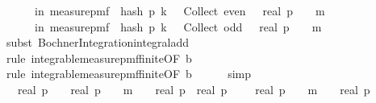 \begin{isabellebody}
\ \ \ \ \ {\isasymP}{\isacharparenleft}{\kern0pt}{\isasymomega}\ in\ measure{\isacharunderscore}{\kern0pt}pmf\ {\isasymOmega}{\isachardot}{\kern0pt}\ hash\ p\ k\ {\isasymomega}\ {\isasymin}\ Collect\ even{\isacharparenright}{\kern0pt}\ \ {\isacharasterisk}{\kern0pt}\ {\isacharparenleft}{\kern0pt}real\ p\ {\isacharminus}{\kern0pt}\ {}{\isacharparenright}{\kern0pt}\ {\isacharcircum}{\kern0pt}\ m\ \ {\isacharplus}{\kern0pt}\ \isanewline
\ \ \ \ \ {\isasymP}{\isacharparenleft}{\kern0pt}{\isasymomega}\ in\ measure{\isacharunderscore}{\kern0pt}pmf\ {\isasymOmega}{\isachardot}{\kern0pt}\ hash\ p\ k\ {\isasymomega}\ {\isasymin}\ Collect\ odd{\isacharparenright}{\kern0pt}\ \ {\isacharasterisk}{\kern0pt}\ {\isacharparenleft}{\kern0pt}{\isacharminus}{\kern0pt}real\ p\ {\isacharminus}{\kern0pt}\ {}{\isacharparenright}{\kern0pt}\ {\isacharcircum}{\kern0pt}\ m\ {\isachardoublequoteclose}\isanewline
\ \ \ \ \isamarkupfalse%
\ {\isacharparenleft}{\kern0pt}subst\ Bochner{\isacharunderscore}{\kern0pt}Integration{\isachardot}{\kern0pt}integral{\isacharunderscore}{\kern0pt}add{\isacharparenright}{\kern0pt}\isanewline
\ \ \ \ \isamarkupfalse%
\ {\isacharparenleft}{\kern0pt}rule\ integrable{\isacharunderscore}{\kern0pt}measure{\isacharunderscore}{\kern0pt}pmf{\isacharunderscore}{\kern0pt}finite{\isacharbrackleft}{\kern0pt}OF\ b{\isacharbrackright}{\kern0pt}{\isacharparenright}{\kern0pt}\isanewline
\ \ \ \ \isamarkupfalse%
\ {\isacharparenleft}{\kern0pt}rule\ integrable{\isacharunderscore}{\kern0pt}measure{\isacharunderscore}{\kern0pt}pmf{\isacharunderscore}{\kern0pt}finite{\isacharbrackleft}{\kern0pt}OF\ b{\isacharbrackright}{\kern0pt}{\isacharparenright}{\kern0pt}\isanewline
\ \ \ \ \isamarkupfalse%
\ simp\isanewline
\ \ \isamarkupfalse%
\ \isamarkupfalse%
\ {\isachardoublequoteopen}{\isachardot}{\kern0pt}{\isachardot}{\kern0pt}{\isachardot}{\kern0pt}\ {\isacharequal}{\kern0pt}\ {\isacharparenleft}{\kern0pt}real\ p\ {\isacharplus}{\kern0pt}\ {}{\isacharparenright}{\kern0pt}\ {\isacharasterisk}{\kern0pt}\ {\isacharparenleft}{\kern0pt}real\ p\ {\isacharminus}{\kern0pt}\ {}{\isacharparenright}{\kern0pt}\ {\isacharcircum}{\kern0pt}\ m\ {\isacharslash}{\kern0pt}\ {\isacharparenleft}{\kern0pt}{}\ {\isacharasterisk}{\kern0pt}\ real\ p{\isacharparenright}{\kern0pt}\ {\isacharplus}{\kern0pt}\ {\isacharparenleft}{\kern0pt}real\ p\ {\isacharminus}{\kern0pt}\ {}{\isacharparenright}{\kern0pt}\ {\isacharasterisk}{\kern0pt}\ {\isacharparenleft}{\kern0pt}{\isacharminus}{\kern0pt}\ real\ p\ {\isacharminus}{\kern0pt}\ {}{\isacharparenright}{\kern0pt}\ {\isacharcircum}{\kern0pt}\ m\ {\isacharslash}{\kern0pt}\ {\isacharparenleft}{\kern0pt}{}\ {\isacharasterisk}{\kern0pt}\ real\ p{\isacharparenright}{\kern0pt}{\isachardoublequoteclose}\isanewline

\end{isabellebody}
